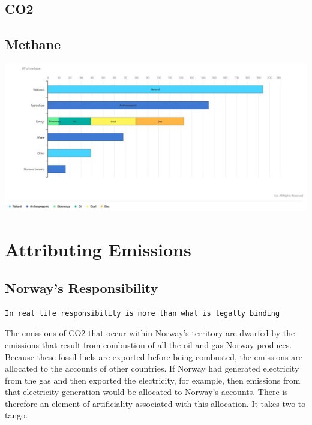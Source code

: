 \documentclass[
]{book}
\begin{document}
\hypertarget{co2}{%
\subsection{CO2}\label{co2}}

\hypertarget{methane}{%
\subsection{Methane}\label{methane}}

\includegraphics{fig/Methane_by_Source.jpeg}

\hypertarget{attributing-emissions}{%
\section{Attributing Emissions}\label{attributing-emissions}}

\hypertarget{norways-responsibility}{%
\subsection{Norway's Responsibility}\label{norways-responsibility}}

\begin{verbatim}
In real life responsibility is more than what is legally binding
\end{verbatim}

The emissions of CO2 that occur within Norway's territory are dwarfed by the emissions that result from combustion of all the oil and gas Norway produces. Because these fossil fuels are exported before being combusted, the emissions are allocated to the accounts of other countries. If Norway had generated electricity from the gas and then exported the electricity, for example, then emissions from that electricity generation would be allocated to Norway's accounts. There is therefore an element of artificiality associated with this allocation. It takes two to tango.
\end{document}
